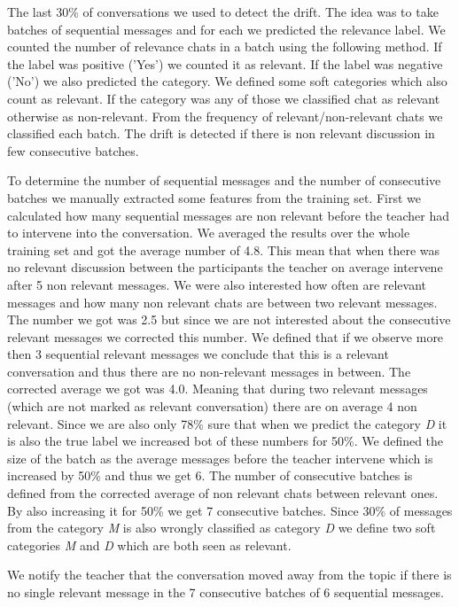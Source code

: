 \documentclass[11pt,a4paper]{article}
\begin{document}
The last 30\% of conversations we used to detect the drift.
The idea was to take batches of sequential messages and for each we predicted the relevance label.
We counted the number of relevance chats in a batch using the following method.
If the label was positive ('Yes') we counted it as relevant.
If the label was negative ('No') we also predicted the category.
We defined some soft categories which also count as relevant.
If the category was any of those we classified chat as relevant otherwise as non-relevant.
From the frequency of relevant/non-relevant chats we classified each batch.
The drift is detected if there is non relevant discussion in few consecutive batches.

To determine the number of sequential messages and the number of consecutive batches we manually extracted some features from the training set.
First we calculated how many sequential messages are non relevant before the teacher had to intervene into the conversation.
We averaged the results over the whole training set and got the average number of 4.8.
This mean that when there was no relevant discussion between the participants the teacher on average intervene after 5 non relevant messages.
We were also interested how often are relevant messages and how many non relevant chats are between two relevant messages.
The number we got was 2.5 but since we are not interested about the consecutive relevant messages we corrected this number.
We defined that if we observe more then 3 sequential relevant messages we conclude that this is a relevant conversation and thus there are no non-relevant messages in between.
The corrected average we got was 4.0.
Meaning that during two relevant messages (which are not marked as relevant conversation) there are on average 4 non relevant.
Since we are also only 78\% sure that when we predict the category \textit{D} it is also the true label we increased bot of these numbers for 50\%.
We defined the size of the batch as the average messages before the teacher intervene which is increased by 50\% and thus we get 6.
The number of consecutive batches is defined from the corrected average of non relevant chats between relevant ones.
By also increasing it for 50\% we get 7 consecutive batches.
Since 30\% of messages from the category \textit{M} is also wrongly classified as category \textit{D} we define two soft categories \textit{M} and \textit{D} which are both seen as relevant.

We notify the teacher that the conversation moved away from the topic if there is no single relevant message in the 7 consecutive batches of 6 sequential messages.
\end{document}
